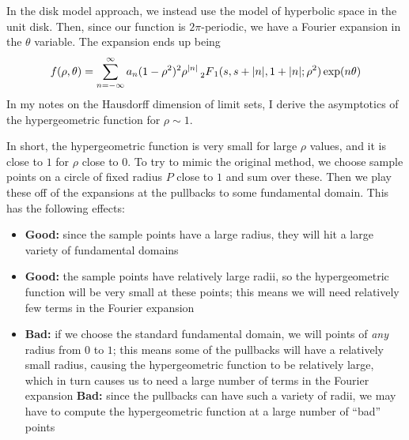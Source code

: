 \documentclass[]{article}
\begin{document}
In the disk model approach, we instead use the model of hyperbolic space in the unit disk.
Then, since our function is $2\pi$-periodic, we have a Fourier expansion in the $\theta$ variable.
The expansion ends up being
$$
f(\rho, \theta) = \sum_{n=-\infty}^{\infty}a_n(1-\rho^2)^2\rho^{|n|}\prescript{}{2}{F}_1(s, s+|n|, 1+|n|; \rho^2)\exp(n\theta)
$$
In my notes on the Hausdorff dimension of limit sets, I derive the asymptotics of the hypergeometric function for $\rho \sim 1$.

In short, the hypergeometric function is very small for large $\rho$ values, and it is close to $1$ for $\rho$ close to $0$.
To try to mimic the original method, we choose sample points on a circle of fixed radius $P$ close to $1$ and sum over these.
Then we play these off of the expansions at the pullbacks to some fundamental domain.
This has the following effects:
\begin{itemize}
	\item \textbf{Good:} since the sample points have a large radius, they will hit a large variety of fundamental domains
	\item \textbf{Good:} the sample points have relatively large radii, so the hypergeometric function will be very small at these points; this means we will need relatively few terms in the Fourier expansion
	\item \textbf{Bad:} if we choose the standard fundamental domain, we will points of \textit{any} radius from $0$ to $1$; this means some of the pullbacks will have a relatively small radius, causing the hypergeometric function to be relatively large, which in turn causes us to need a large number of terms in the Fourier expansion
	\textbf{Bad:} since the pullbacks can have such a variety of radii, we may have to compute the hypergeometric function at a large number of ``bad'' points
\end{itemize}
	
\end{document}
